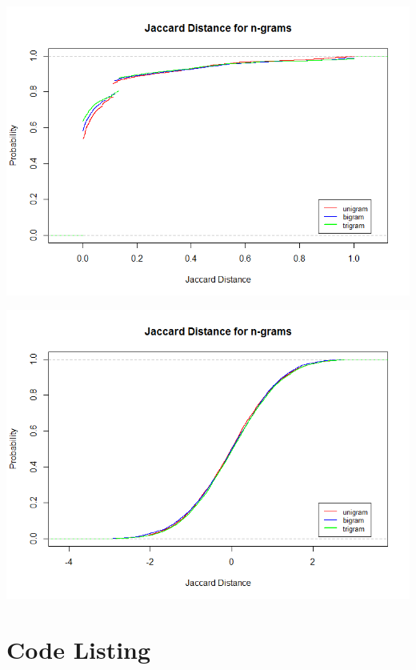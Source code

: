 	\begin{minipage}{\linewidth}
		\centering
			\includegraphics[scale=0.55]{figures/q1/ngram}
		\label{wordCount}
	\end{minipage}
	
	\begin{minipage}{\linewidth}
		\centering
			\includegraphics[scale=0.55]{figures/q1/ngram_normalized}
		\label{wordCount}
	\end{minipage}

\newpage
\section{Code Listing}

